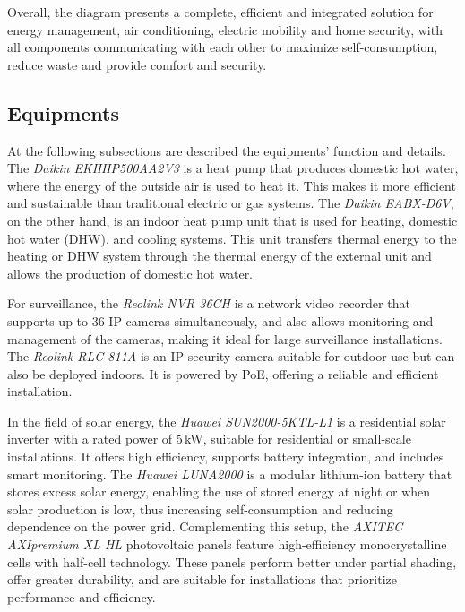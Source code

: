 \documentclass[graybox]{svmult}
\begin{document}
Overall, the diagram presents a complete, efficient and integrated solution for energy management, air conditioning, electric mobility and home security, with all components communicating with each other to maximize self-consumption, reduce waste and provide comfort and security.

\subsection{Equipments}

At the following subsections are described the equipments’ function and details.\\

The \textit{Daikin EKHHP500AA2V3} is a heat pump that produces domestic hot water, where the energy of the outside air is used to heat it. This makes it more efficient and sustainable than traditional electric or gas systems. The \textit{Daikin EABX-D6V}, on the other hand, is an indoor heat pump unit that is used for heating, domestic hot water (DHW), and cooling systems. This unit transfers thermal energy to the heating or DHW system through the thermal energy of the external unit and allows the production of domestic hot water.

For surveillance, the \textit{Reolink NVR 36CH} is a network video recorder that supports up to 36 IP cameras simultaneously, and also allows monitoring and management of the cameras, making it ideal for large surveillance installations. The \textit{Reolink RLC-811A} is an IP security camera suitable for outdoor use but can also be deployed indoors. It is powered by PoE, offering a reliable and efficient installation.

In the field of solar energy, the \textit{Huawei SUN2000-5KTL-L1} is a residential solar inverter with a rated power of 5\,kW, suitable for residential or small-scale installations. It offers high efficiency, supports battery integration, and includes smart monitoring. The \textit{Huawei LUNA2000} is a modular lithium-ion battery that stores excess solar energy, enabling the use of stored energy at night or when solar production is low, thus increasing self-consumption and reducing dependence on the power grid. Complementing this setup, the \textit{AXITEC AXIpremium XL HL} photovoltaic panels feature high-efficiency monocrystalline cells with half-cell technology. These panels perform better under partial shading, offer greater durability, and are suitable for installations that prioritize performance and efficiency.
\end{document}
